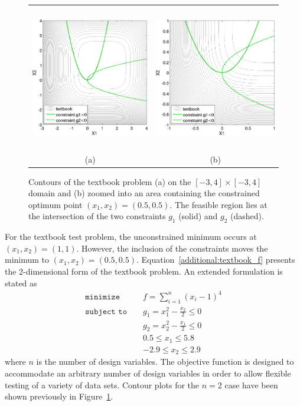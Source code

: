 \begin{figure}[htp!]
  \centering
  \begin{tabular}{cc}
  \includegraphics[height=2.5in]{images/textbook_contours} &
  \includegraphics[height=2.5in]{images/textbook_closeup} \\
  (a) & (b) \\
  \end{tabular}
  \caption{Contours of the textbook problem (a) on the $[-3,4] \times
    [-3,4]$ domain and (b) zoomed into an area containing the
    constrained optimum point $(x_1,x_2) = (0.5,0.5)$. The
    feasible region lies at the intersection of the two constraints
    $g_1$ (solid) and $g_2$ (dashed).}
  \label{additional:textbook_prob}
\end{figure}

For the textbook test problem, the unconstrained minimum occurs at
$(x_1,x_2) = (1,1)$. However, the inclusion of the constraints
moves the minimum to $(x_1,x_2) = (0.5,0.5)$.
Equation~\ref{additional:textbook_f} presents the 2-dimensional
form of the textbook problem. An extended formulation is stated as
\begin{eqnarray}
\texttt{minimize }   & & f = \sum_{i=1}^{n}(x_i-1)^4 \nonumber\\
\texttt{subject to } & & g_1 = x_1^2-\frac{x_2}{2} \leq 0
  \label{additional:tbe}\\
  & & g_2=x_2^2-\frac{x_1}{2} \leq 0\nonumber\\
  & & 0.5 \leq x_1 \leq 5.8\nonumber\\
  & & -2.9 \leq x_2 \leq 2.9\nonumber
\end{eqnarray}
where $n$ is the number of design variables. The objective function is
designed to accommodate an arbitrary number of design variables in
order to allow flexible testing of a variety of data sets. Contour
plots for the $n=2$ case have been shown previously in
Figure~\ref{additional:textbook_prob}.

